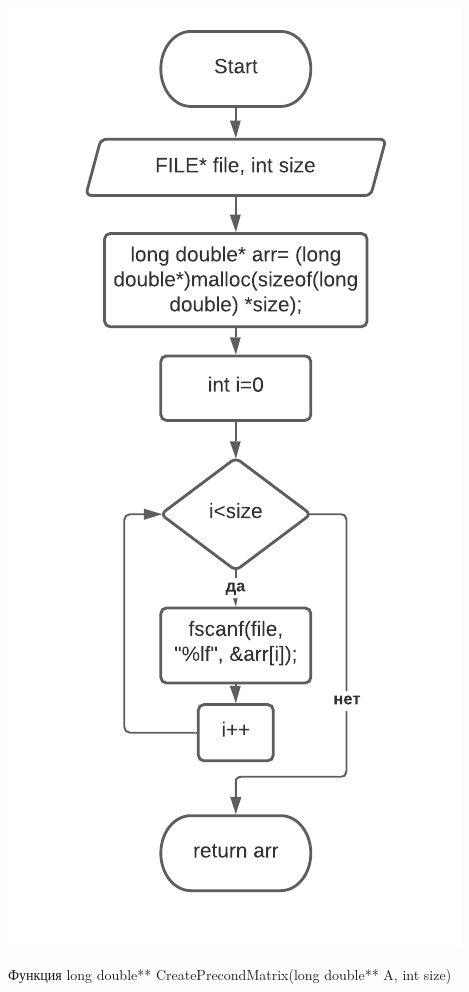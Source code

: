 \includegraphics[scale=0.5]{block2.pdf}

Функция long double** CreatePrecondMatrix(long double** A, int size)

